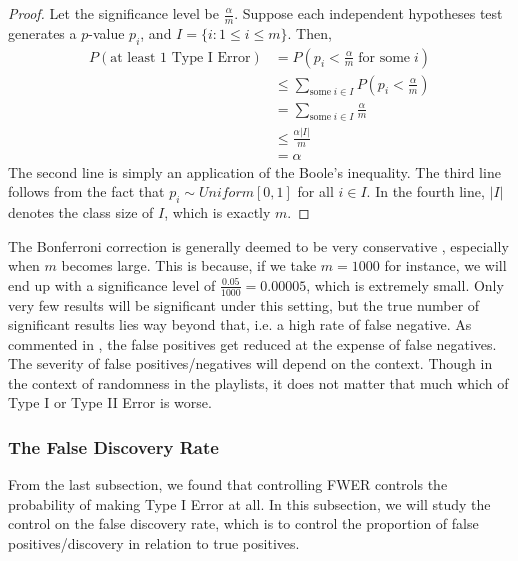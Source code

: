 \documentclass[12pt]{article}
\theoremstyle{plain}
\theoremstyle{definition}
\theoremstyle{remark}
\begin{document}
\begin{proof}\cite{5.3}
Let the significance level be $\frac{\alpha}{m}$. Suppose each independent hypotheses test generates a $p$-value $p_i$, and $I=\{i:1\leq i\leq m\}$. Then,
\begin{align*}
    P(\text{at least 1 Type I Error})&=P(p_i<\frac{\alpha}{m}\; \text{for some} \;i)\\
    &\leq\sum_{\text{some}\; i\in I} P(p_i<\frac{\alpha}{m})\\
    &=\sum_{\text{some}\; i\in I}\frac{\alpha}{m}\\
    &\leq\frac{\alpha|I|}{m}\\
    &=\alpha
\end{align*}
The second line is simply an application of the Boole's inequality. The third line follows from the fact that $p_i\sim Uniform[0,1]$ for all $i\in I$. In the fourth line, $|I|$ denotes the class size of $I$, which is exactly $m$. 
\end{proof}

The Bonferroni correction is generally deemed to be very conservative \cite{5.4}\cite{5.1}\cite{5.3}\cite{5.5}\cite{5.6}, especially when $m$ becomes large. This is because, if we take $m=1000$ for instance, we will end up with a significance level of $\frac{0.05}{1000}=0.00005$, which is extremely small. Only very few results will be significant under this setting, but the true number of significant results lies way beyond that, i.e. a high rate of false negative. As commented in \cite{5.5}, the false positives get reduced at the expense of false negatives. The severity of false positives/negatives will depend on the context. Though in the context of randomness in the playlists, it does not matter that much which of Type I or Type II Error is worse.

\newpage
\subsubsection{The False Discovery Rate}
From the last subsection, we found that controlling FWER controls the probability of making Type I Error at all. In this subsection, we will study the control on the false discovery rate, which is to control the proportion of false positives/discovery in relation to true positives. 
\end{document}

